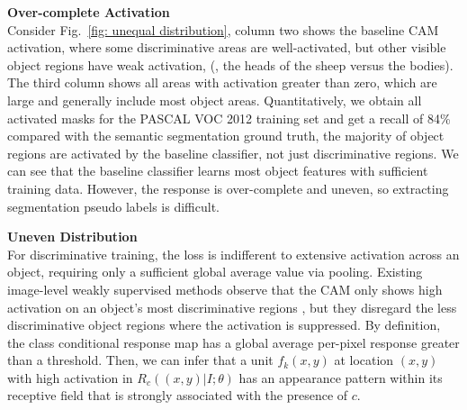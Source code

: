 \documentclass[10pt,twocolumn,letterpaper]{article}
\begin{document}
\noindent\textbf{Over-complete Activation}\\
Consider Fig.~\ref{fig: unequal distribution}, column two  shows the baseline CAM activation, where some discriminative areas are well-activated, but other visible object regions have weak activation, (\eg, the heads of the sheep versus the bodies). The third column shows all areas with activation greater than zero, which are large and generally include most object areas. Quantitatively, we obtain all activated masks for the PASCAL VOC 2012 training set and get a recall of 84\% compared with the semantic segmentation ground truth, \ie the majority of object regions are activated by the baseline classifier, not just discriminative regions.
We can see that the baseline classifier learns most object features with sufficient training data.
However, the response is over-complete and uneven,
so extracting segmentation pseudo labels is difficult.


\noindent\textbf{Uneven Distribution}\\
For discriminative training, the loss is indifferent to extensive activation across an object, requiring only a sufficient global average value via pooling.
Existing image-level weakly supervised methods observe that the CAM only shows high activation on an object's most discriminative regions \cite{wei2017object, singh2017hide, wei2018revisiting, hou2018self, chang2020mixup, guo2019mixup, chang2020weakly, wang2020self, zhang2020splitting},
but they disregard the less discriminative object regions where the activation is suppressed.
By definition, the class conditional response map has a global average per-pixel response greater than a threshold. Then, we can infer that a unit $f_k(x,y)$ at location $(x,y)$ with high activation in $R_c((x,y)|I;\theta)$ has an appearance pattern within its receptive field that is strongly associated with the presence of $c$.
\end{document}
